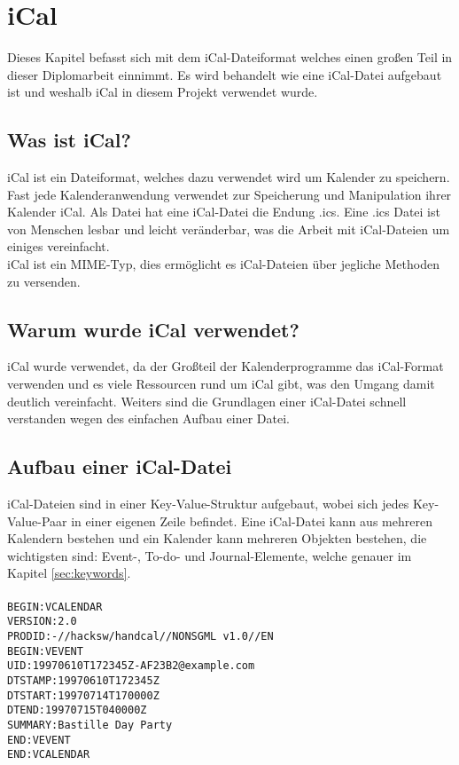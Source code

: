 
\renewcommand{\theauthor}{Matthias Franz}
\section{iCal}
\label{sec:iCal}
Dieses Kapitel befasst sich mit dem iCal-Dateiformat welches einen großen Teil in dieser Diplomarbeit einnimmt. Es wird behandelt wie eine iCal-Datei aufgebaut ist und weshalb iCal in diesem Projekt verwendet wurde.

\subsection{Was ist iCal?}
\label{sec:wasIstiCal?}
iCal ist ein Dateiformat, welches dazu verwendet wird um Kalender zu speichern. Fast jede Kalenderanwendung verwendet zur Speicherung und Manipulation ihrer Kalender iCal. Als Datei hat eine iCal-Datei die Endung .ics. Eine .ics Datei ist von Menschen lesbar und leicht veränderbar, was die Arbeit mit iCal-Dateien um einiges vereinfacht. \\
iCal ist ein MIME-Typ, dies ermöglicht es iCal-Dateien über jegliche Methoden zu versenden.\\ \textcite{iCalDocumentation} 

\subsection{Warum wurde iCal verwendet?}
\label{sec:warumWurdeiCalVerwendet?}
iCal wurde verwendet, da der Großteil der Kalenderprogramme das iCal-Format verwenden und es viele Ressourcen rund um iCal gibt, was den Umgang damit deutlich vereinfacht. Weiters sind die Grundlagen einer iCal-Datei schnell verstanden wegen des einfachen Aufbau einer Datei.

\subsection{Aufbau einer iCal-Datei}
\label{sec:aufbauEineriCalDatei}
iCal-Dateien sind in einer Key-Value-Struktur aufgebaut, wobei sich jedes Key-Value-Paar in einer eigenen Zeile befindet. Eine iCal-Datei kann aus mehreren Kalendern bestehen und ein Kalender kann mehreren Objekten bestehen, die wichtigsten sind: Event-, To-do- und Journal-Elemente, welche genauer im Kapitel \ref{sec:keywords}.\\\\
\texttt{BEGIN:VCALENDAR\\
 VERSION:2.0\\
 PRODID:-//hacksw/handcal//NONSGML v1.0//EN\\
 BEGIN:VEVENT\\
 UID:19970610T172345Z-AF23B2@example.com\\
 DTSTAMP:19970610T172345Z\\
 DTSTART:19970714T170000Z\\
 DTEND:19970715T040000Z\\
 SUMMARY:Bastille Day Party\\
 END:VEVENT\\
 END:VCALENDAR}\\\\
 
